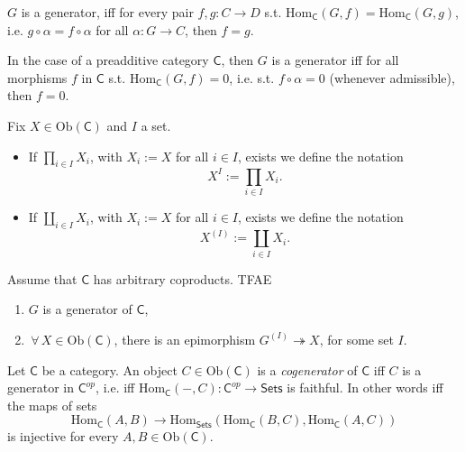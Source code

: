 \begin{rem}
	$G$ is a generator, iff for every pair $f,g: C \to D$
	s.t. $\mathrm{Hom}_{\mathsf{C}} \left( G, f \right) = \mathrm{Hom}_{\mathsf{C}} \left( G, g \right)$,
	i.e. $g \circ \alpha = f \circ \alpha$ for all $\alpha: G \to C$, then $f = g$.

	In the case of a preadditive category $\mathsf{C}$, then $G$ is a generator iff
	for all morphisms $f$ in $\mathsf{C}$ s.t. $\mathrm{Hom}_{\mathsf{C}} \left( G, f \right) = 0$,
	i.e. s.t. $f \circ \alpha = 0$ (whenever admissible), then $f = 0$.
\end{rem}

\begin{defn}
	Fix $X \in \mathrm{Ob} \left(\mathsf{C}\right)$ and $I$ a set.
	\begin{itemize}
		\item If $\prod_{i \in I} X_i$, with $X_i := X$ for all $i \in I$, exists we define the notation
			\begin{equation}
			X^I := \prod_{i \in I} X_i
			.\end{equation} 
		\item If $\coprod_{i \in I} X_i$, with $X_i := X$ for all $i \in I$, exists we define the notation
			\begin{equation}
				X^{(I)} := \coprod_{i \in I} X_i
			.\end{equation} 
	\end{itemize}
\end{defn}

\begin{prop}
	Assume that $\mathsf{C}$ has arbitrary coproducts.
	TFAE
	\begin{enumerate}
		\item $G$ is a generator of $\mathsf{C}$,
		\item $\,\forall\, X \in \mathrm{Ob} \left(\mathsf{C}\right)$, there is an epimorphism
			$G^{(I)} \twoheadrightarrow X$, for some set $I$.
	\end{enumerate}
\end{prop} 

\begin{defn}
	Let $\mathsf{C}$ be a category.
	An object $C \in \mathrm{Ob} \left(\mathsf{C}\right)$ is a {\em cogenerator} of $\mathsf{C}$ iff
	$C$ is a generator in $\mathsf{C}^{op}$, i.e. iff
	$\mathrm{Hom}_{\mathsf{C}} \left( -, C \right): \mathsf{C}^{op} \to \mathsf{Sets}$ is faithful.
	In other words iff the maps of sets
	 \begin{equation}
	\mathrm{Hom}_{\mathsf{C}} \left( A, B \right) \to
	\mathrm{Hom}_{\mathsf{Sets}} \left( \mathrm{Hom}_{\mathsf{C}} \left( B, C \right), 
	\mathrm{Hom}_{\mathsf{C}} \left( A, C \right) \right)
	\end{equation} 
	is injective for every $A, B \in \mathrm{Ob} \left(\mathsf{C}\right)$.
\end{defn}

